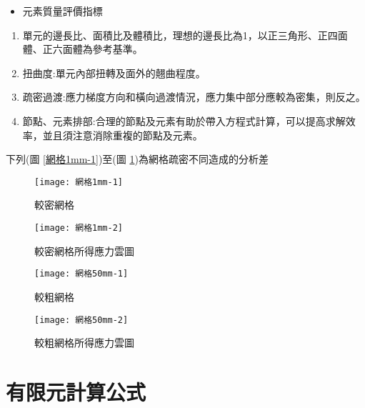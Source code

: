 \begin{itemize}
\item 元素質量評價指標
\end{itemize}

\begin{enumerate}
\item 單元的邊長比、面積比及體積比，理想的邊長比為1，以正三角形、正四面體、正六面體為參考基準。
\item 扭曲度:單元內部扭轉及面外的翹曲程度。
\item 疏密過渡:應力梯度方向和橫向過渡情況，應力集中部分應較為密集，則反之。
\item 節點、元素排部:合理的節點及元素有助於帶入方程式計算，可以提高求解效率，並且須注意消除重複的節點及元素。
\end{enumerate}
下列(圖 \ref{網格1mm-1})至(圖 \ref{網格50mm-2})為網格疏密不同造成的分析差\

\begin{figure}[htbp]
  \centering
  \begin{minipage}{0.45\textwidth}
    \centering
    \texttt{[image: 網格1mm-1]}
    \caption{較密網格}
    \label{網格1mm-1}
  \end{minipage}
  \hfill
  \begin{minipage}{0.45\textwidth}
    \centering
    \texttt{[image: 網格1mm-2]}
    \caption{較密網格所得應力雲圖}
    \label{網格1mm-2}
  \end{minipage}
  
  \vspace{0.75cm} %
  
  \begin{minipage}{0.45\textwidth}
    \centering
    \texttt{[image: 網格50mm-1]}
    \caption{較粗網格}
    \label{網格50mm-1}
  \end{minipage}
  \hfill
  \begin{minipage}{0.45\textwidth}
    \centering
    \texttt{[image: 網格50mm-2]}
    \caption{較粗網格所得應力雲圖}
    \label{網格50mm-2}
  \end{minipage}
\end{figure}
\newpage

\section{有限元計算公式}


